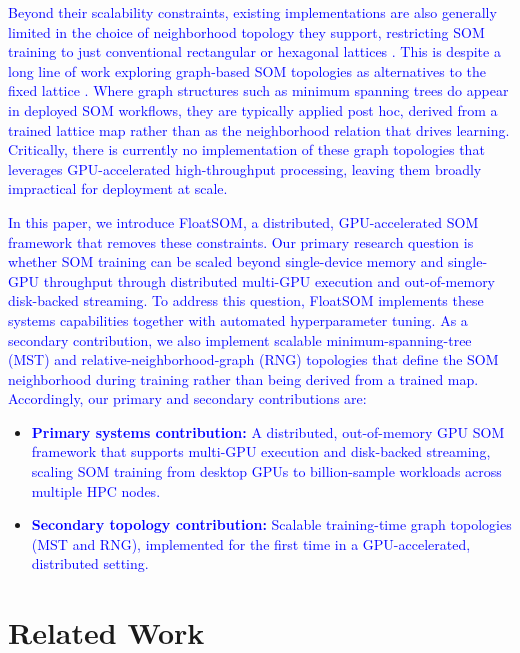 \documentclass[10pt]{article} %
\newcommand{\TrackedChange}[1]{\textcolor{blue}{#1}}
\begin{document}
\TrackedChange{Beyond their scalability constraints, existing implementations are also generally limited in the choice of neighborhood topology they support, restricting SOM training to just conventional rectangular or hexagonal lattices \citep{kohonenSelforganizingMap1990,kohonenEssentialsSelforganizingMap2013}. This is despite a long line of work exploring graph-based SOM topologies as alternatives to the fixed lattice \citep{alahakoonDynamicSelforganizingMaps2000,vasighiDirectedBatchGrowing2017,kangasVariantsSelforganizingMaps1990,spanakisAMSOMAdaptiveMoving2016}. Where graph structures such as minimum spanning trees do appear in deployed SOM workflows, they are typically applied post hoc, derived from a trained lattice map \citep{vangassenFlowSOMUsingSelforganizing2015,jangUseMinimalSpanning2009} rather than as the neighborhood relation that drives learning. Critically, there is currently no implementation of these graph topologies that leverages GPU-accelerated high-throughput processing, leaving them broadly impractical for deployment at scale.}

\TrackedChange{In this paper, we introduce FloatSOM, a distributed, GPU-accelerated SOM framework that removes these constraints. Our primary research question is whether SOM training can be scaled beyond single-device memory and single-GPU throughput through distributed multi-GPU execution and out-of-memory disk-backed streaming. To address this question, FloatSOM implements these systems capabilities together with automated hyperparameter tuning. As a secondary contribution, we also implement scalable minimum-spanning-tree (MST) and relative-neighborhood-graph (RNG) topologies that define the SOM neighborhood during training rather than being derived from a trained map. Accordingly, our primary and secondary contributions are:}

\begin{itemize}
\item \TrackedChange{\textbf{Primary systems contribution:} A distributed, out-of-memory GPU SOM framework that supports multi-GPU execution and disk-backed streaming, scaling SOM training from desktop GPUs to billion-sample workloads across multiple HPC nodes.}
\item \TrackedChange{\textbf{Secondary topology contribution:} Scalable training-time graph topologies (MST and RNG), implemented for the first time in a GPU-accelerated, distributed setting.}
\end{itemize}

\section{Related Work}
\end{document}
